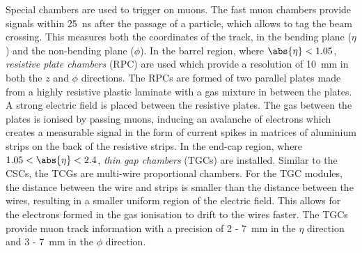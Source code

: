 Special chambers are used to trigger on muons. The fast muon chambers provide signals within \SI{25}{\nano\second} after the passage of a particle, which allows to tag the beam crossing. This measures both the coordinates of the track, in the bending plane ($\eta$) and the non-bending plane ($\phi$). In the barrel region, where $\abs{\eta} < 1.05$, \emph{resistive plate chambers} (RPC) are used which provide a resolution of \SI{10}{\milli\meter} in both the $z$ and $\phi$ directions. The RPCs are formed of two parallel plates made from a highly resistive plastic laminate with a gas mixture in between the plates. A strong electric field is placed between the resistive plates. The gas between the plates is ionised by passing muons, inducing an avalanche of electrons which creates a measurable signal in the form of current spikes in matrices of aluminium strips on the back of the resistive strips. In the end-cap region, where $1.05 < \abs{\eta} < 2.4$, \emph{thin gap chambers} (TGCs) are installed. Similar to the CSCs, the TCGs are multi-wire proportional chambers. For the TGC modules, the distance between the wire and strips is smaller than the distance between the wires, resulting in a smaller uniform region of the electric field. This allows for the electrons formed in the gas ionisation to drift to the wires faster. The TGCs provide muon track information with a precision of 2 - \SI{7}{\milli\meter} in the $\eta$ direction and 3 - \SI{7}{\milli\meter} in the $\phi$ direction.

